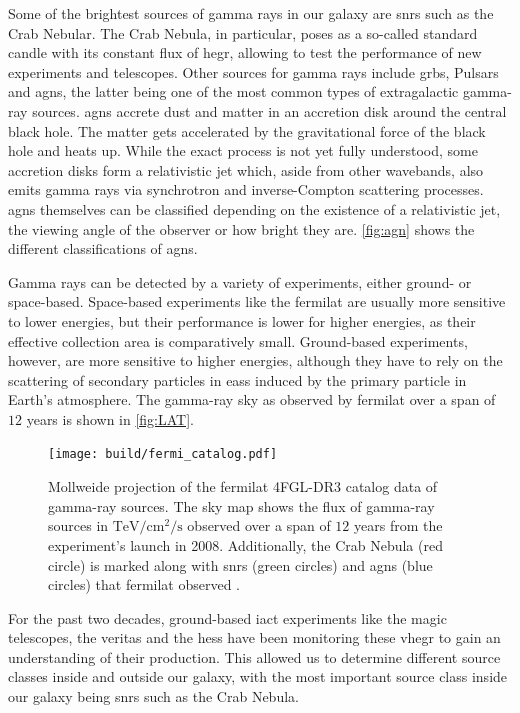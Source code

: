 Some of the brightest sources of gamma rays in our galaxy are \glspl{snr} such as the Crab Nebular.
The Crab Nebula, in particular, poses as a so-called standard candle with its constant flux of
\gls{hegr}, allowing to test the performance of new experiments and telescopes. Other sources for
gamma rays include \glspl{grb}, Pulsars and \glspl{agn}, the latter being one of the most common types
of extragalactic gamma-ray sources. \glspl{agn} accrete dust and matter in an accretion disk around the
central black hole. The matter gets accelerated by the gravitational force of the black hole and heats
up. While the exact process is not yet fully understood, some accretion disks form a relativistic jet
which, aside from other wavebands, also emits gamma rays via synchrotron
and inverse-Compton scattering processes. \glspl{agn} themselves can be classified depending on the existence
of a relativistic jet, the viewing angle of the observer or how bright they are. \autoref{fig:agn}
shows the different classifications of \glspl{agn}.

Gamma rays can be detected by a variety of experiments, either ground- or space-based. Space-based
experiments like the \gls{fermilat} are usually more sensitive to lower energies, but their performance
is lower for higher energies, as their effective collection area is comparatively small. Ground-based
experiments, however, are more sensitive to higher energies, although they have to rely on the scattering
of secondary particles in \glspl{eas} induced by the primary particle in Earth's atmosphere.
The gamma-ray sky as observed by \gls{fermilat} over a span of
\(\num{12}\) years is shown in \autoref{fig:LAT}.

\begin{figure}
    \centering
    \texttt{[image: build/fermi\_catalog.pdf]}
    \caption{Mollweide projection of the \gls{fermilat} 4FGL-DR3 catalog data of gamma-ray sources. The sky map
    shows the flux of gamma-ray sources in \(\si{\tera\eV\per\centi\meter\squared\per\second}\)
    observed over a span of \(\num{12}\) years from the experiment's launch in 2008. Additionally,
    the Crab Nebula (red circle) is marked along with \glspl{snr} (green circles) and \glspl{agn} (blue circles) that \gls{fermilat}
    observed \cite{fermi4fgl, fermi4fgldr3}.}
    \label{fig:LAT}
\end{figure}

For the past two decades, ground-based \gls{iact} experiments like the \gls{magic} telescopes, the
\gls{veritas} and the \gls{hess} have been monitoring these \gls{vhegr} to gain an understanding of
their production. This allowed us to determine different source classes inside and outside our galaxy,
with the most important source class inside our galaxy being \glspl{snr} such as the Crab Nebula.





